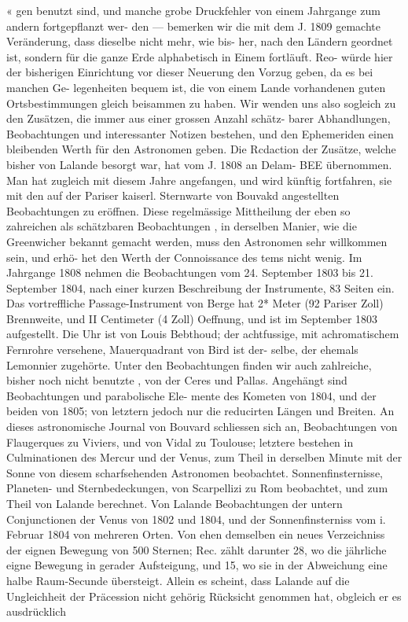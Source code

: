 \documentclass[12pt,a4paper]{article}
\begin{document}
« gen  benutzt  sind,  und  manche  grobe  Druckfehler  von  einem  Jahrgange  zum  andern  fortgepflanzt  wer- den ---  bemerken  wir  die  mit  dem  J.  1809  gemachte  Veränderung,  dass  dieselbe  nicht  mehr,  wie  bis- her, nach  den  Ländern  geordnet  ist,  sondern  für  die  ganze  Erde  alphabetisch  in  Einem  fortläuft.  Reo- würde  hier  der  bisherigen  Einrichtung  vor  dieser  Neuerung  den  Vorzug  geben,  da  es  bei  manchen  Ge- legenheiten bequem  ist,  die  von  einem  Lande  vorhandenen  guten  Ortsbestimmungen  gleich  beisammen zu  haben.  Wir  wenden  uns  also  sogleich  zu  den  Zusätzen,  die  immer  aus  einer  grossen  Anzahl  schätz- barer Abhandlungen,  Beobachtungen  und  interessanter  Notizen  bestehen,  und  den  Ephemeriden  einen bleibenden  Werth  für  den  Astronomen  geben. Die  Rcdaction  der  Zusätze,  welche  bisher  von  Lalande  besorgt  war,  hat  vom  J.  1808  an  Delam- BEE  übernommen.  Man  hat  zugleich  mit  diesem  Jahre  angefangen,  und  wird  künftig  fortfahren,  sie mit  den  auf  der  Pariser  kaiserl.  Sternwarte  von  Bouvakd  angestellten  Beobachtungen  zu  eröffnen.  Diese regelmässige  Mittheilung  der  eben  so  zahreichen  als  schätzbaren  Beobachtungen ,  in  derselben  Manier, wie  die  Greenwicher  bekannt  gemacht  werden,  muss  den  Astronomen  sehr  willkommen  sein,  und  erhö- het den  Werth  der  Connoissance  des  tems  nicht  wenig.  Im  Jahrgange  1808  nehmen  die  Beobachtungen vom  24.  September  1803  bis  21.  September  1804,  nach  einer  kurzen  Beschreibung  der  Instrumente,  83 Seiten  ein.  Das  vortreffliche  Passage-Instrument  von  Berge  hat  2*  Meter  (92  Pariser  Zoll)  Brennweite, und  II  Centimeter  (4  Zoll)  Oeffnung,  und  ist  im  September  1803  aufgestellt.  Die  Uhr  ist  von  Louis Bebthoud;  der  achtfussige,  mit  achromatischem  Fernrohre  versehene,  Mauerquadrant  von  Bird  ist  der- selbe, der  ehemals  Lemonnier  zugehörte.  Unter  den  Beobachtungen  finden  wir  auch  zahlreiche,  bisher noch  nicht  benutzte ,  von  der  Ceres  und  Pallas.  Angehängt  sind  Beobachtungen  und  parabolische  Ele- mente des  Kometen  von  1804,  und  der  beiden  von  1805;  von  letztern  jedoch  nur  die  reducirten  Längen und  Breiten.  An  dieses  astronomische  Journal  von  Bouvard  schliessen  sich  an,  Beobachtungen  von Flaugerques  zu  Viviers,  und  von  Vidal  zu  Toulouse;  letztere  bestehen  in  Culminationen  des  Mercur und  der  Venus,  zum  Theil  in  derselben  Minute  mit  der  Sonne  von  diesem  scharfsehenden  Astronomen beobachtet.  Sonnenfinsternisse,  Planeten-  und  Sternbedeckungen,  von  Scarpellizi  zu  Rom  beobachtet, und  zum  Theil  von  Lalande  berechnet.  Von  Lalande  Beobachtungen  der  untern  Conjunctionen  der Venus  von  1802  und  1804,  und  der  Sonnenfinsterniss  vom  i.  Februar  1804  von  mehreren  Orten.  Von ehen  demselben  ein  neues  Verzeichniss  der  eignen  Bewegung  von  500  Sternen;  Rec.  zählt  darunter  28,  wo die  jährliche  eigne  Bewegung  in  gerader  Aufsteigung,  und  15,  wo  sie  in  der  Abweichung  eine  halbe Raum-Secunde  übersteigt.  Allein  es  scheint,  dass  Lalande  auf  die  Ungleichheit  der  Präcession  nicht gehörig  Rücksicht  genommen  hat,  obgleich  er  es  ausdrücklich  
\end{document}
